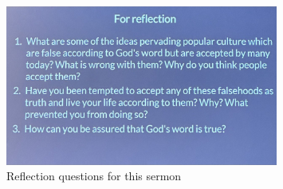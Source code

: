\begin{itemize}
{\begin{figure}[H]
    \includegraphics[width=0.8\textwidth, trim={0cm 0cm 0cm 0cm},clip]{Figures/aprilSermon4Reflections.jpg}
    \caption[]{Reflection questions for this sermon}
    \label{}
  \end{figure}}
\end{itemize}